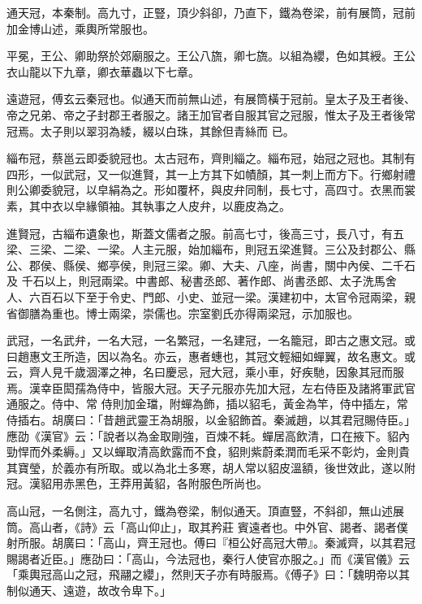 \begin{pinyinscope}
 通天冠，本秦制。高九寸，正豎，頂少斜卻，乃直下，鐵為卷梁，前有展筒，冠前加金博山述，乘輿所常服也。



 平冕，王公、卿助祭於郊廟服之。王公八旒，卿七旒。以組為纓，色如其綬。王公衣山龍以下九章，卿衣華蟲以下七章。



 遠遊冠，傅玄云秦冠也。似通天而前無山述，有展筒橫于冠前。皇太子及王者後、帝之兄弟、帝之子封郡王者服之。諸王加官者自服其官之冠服，惟太子及王者後常冠焉。太子則以翠羽為緌，綴以白珠，其餘但青絲而
 已。



 緇布冠，蔡邕云即委貌冠也。太古冠布，齊則緇之。緇布冠，始冠之冠也。其制有四形，一似武冠，又一似進賢，其一上方其下如幘顏，其一刺上而方下。行鄉射禮則公卿委貌冠，以皁絹為之。形如覆杯，與皮弁同制，長七寸，高四寸。衣黑而裳素，其中衣以皁緣領袖。其執事之人皮弁，以鹿皮為之。



 進賢冠，古緇布遺象也，斯蓋文儒者之服。前高七寸，後高三寸，長八寸，有五梁、三梁、二梁、一梁。人主元服，始加緇布，則冠五梁進賢。三公及封郡公、縣公、郡侯、縣侯、鄉亭侯，則冠三梁。卿、大夫、八座，尚書，關中內侯、二千石及
 千石以上，則冠兩梁。中書郎、秘書丞郎、著作郎、尚書丞郎、太子洗馬舍人、六百石以下至于令史、門郎、小史、並冠一梁。漢建初中，太官令冠兩梁，親省御膳為重也。博士兩梁，崇儒也。宗室劉氏亦得兩梁冠，示加服也。



 武冠，一名武弁，一名大冠，一名繁冠，一名建冠，一名籠冠，即古之惠文冠。或曰趙惠文王所造，因以為名。亦云，惠者蟪也，其冠文輕細如蟬翼，故名惠文。或云，齊人見千歲涸澤之神，名曰慶忌，冠大冠，乘小車，好疾馳，因象其冠而服焉。漢幸臣閎孺為侍中，皆服大冠。天子元服亦先加大冠，左右侍臣及諸將軍武官通服之。侍中、常
 侍則加金璫，附蟬為飾，插以貂毛，黃金為竿，侍中插左，常侍插右。胡廣曰：「昔趙武靈王為胡服，以金貂飾首。秦滅趙，以其君冠賜侍臣。」應劭《漢官》云：「說者以為金取剛強，百煉不耗。蟬居高飲清，口在掖下。貂內勁悍而外柔縟。」又以蟬取清高飲露而不食，貂則紫蔚柔潤而毛采不彰灼，金則貴其寶瑩，於義亦有所取。或以為北土多寒，胡人常以貂皮溫額，後世效此，遂以附冠。漢貂用赤黑色，王莽用黃貂，各附服色所尚也。



 高山冠，一名側注，高九寸，鐵為卷梁，制似通天。頂直豎，不斜卻，無山述展筒。高山者，《詩》云「高山仰止」，取其矜莊
 賓遠者也。中外官、謁者、謁者僕射所服。胡廣曰：「高山，齊王冠也。傅曰『桓公好高冠大帶』。秦滅齊，以其君冠賜謁者近臣。」應劭曰：「高山，今法冠也，秦行人使官亦服之。」而《漢官儀》云「乘輿冠高山之冠，飛翮之纓」，然則天子亦有時服焉。《傅子》曰：「魏明帝以其制似通天、遠遊，故改令卑下。」




\end{pinyinscope}
